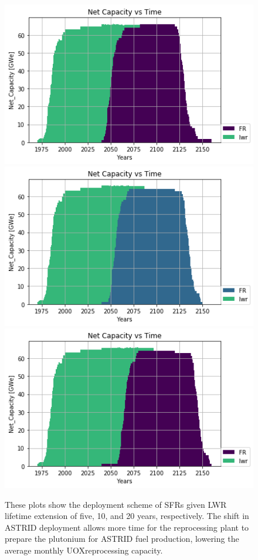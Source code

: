\begin{figure}[htbp!]
    \begin{center}
        \includegraphics[height=0.25\textheight]{./images/sensitivity/5.png}
        \includegraphics[height=0.25\textheight]{./images/sensitivity/10.png}
        \includegraphics[height=0.25\textheight]{./images/sensitivity/20.png}
    \end{center}
    \caption{These plots show the deployment scheme of \glspl{SFR} given 
              \gls{LWR} lifetime extension of five, 10, and 20 years, 
              respectively. The shift in \gls{ASTRID} deployment allows more
              time for the reprocessing plant to prepare the plutonium 
              for \gls{ASTRID} fuel production, lowering
             the average monthly \gls{UOX}reprocessing capacity.}
    \label{fig:ext}
\end{figure}
